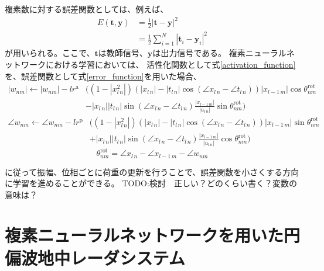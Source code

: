 \documentclass[11pt,a4paper,uplatex]{ujarticle}
\begin{document}
    複素数に対する誤差関数としては、例えば、
    \begin{equation}\label{error_function}
      \begin{split}
      E(\bm{t}, \bm{y})  & = \frac{1}{2}|\bm{t} - \bm{y}|^2\\
      & = \frac{1}{2}\sum_{i=1}^{N}|\bm{t}_i - \bm{y}_i|^2
      \end{split}
    \end{equation}
    が用いられる。ここで、$\bm{t}$は教師信号、$\bm{y}$は出力信号である。
    複素ニューラルネットワークにおける学習においては、
    活性化関数として式\ref{activation_function}を、誤差関数として式\ref{error_function}を用いた場合、
    \begin{equation}
      \label{eq:update_a}
      \begin{split}
        |w_{nm}| \leftarrow |w_{nm}| - lr^\mathrm{a} & \biggl( (1-|x_{l\,n}^2|)(|x_{l\, n}| - |t_{l\, n}| \cos (\angle x_{l\, n} - \angle t_{l\, n}))|x_{l-1\, m}| \cos \theta^{\mathrm{rot}}_{nm}  \\
                        & - |x_{l\, n}| |t_{l\, n}| \sin (\angle x_{l\, n} - \angle t_{l\, n}) \frac{|x_{l-1\, m}|}{|u_{l\, n}|} \sin \theta^{\mathrm{rot}}_{nm} \biggr)
      \end{split}
    \end{equation}
    \begin{equation}
      \label{eq:update_p}
      \begin{split}
        \angle w_{nm} \leftarrow \angle w_{nm} - lr^\mathrm{p} & \bigg( (1-|x_{l\,n}^2|)(|x_{l\, n}| - |t_{l\, n}| \cos (\angle x_{l\, n} - \angle t_{l\, n}))|x_{l-1\, m}| \sin \theta^{\mathrm{rot}}_{nm} \\
                        &  + |x_{l\, n}| |t_{l\, n}| \sin (\angle x_{l\, n} - \angle t_{l\, n}) \frac{|x_{l-1\, m}|}{|u_{l\, n}|} \cos \theta^{\mathrm{rot}}_{nm} \bigg)
      \end{split}
    \end{equation}
    \begin{equation}
      \label{eq:rot}
        \theta^{\mathrm{rot}}_{nm} = \angle x_{l\, n} - \angle x_{l-1\, m} -\angle w_{nm}
    \end{equation}

    に従って振幅、位相ごとに荷重の更新を行うことで、誤差関数を小さくする方向に学習を進めることができる。\cite{CVNN}
    TODO:検討　正しい？どのくらい書く？変数の意味は？



\section{複素ニューラルネットワークを用いた円偏波地中レーダシステム}
\end{document}
